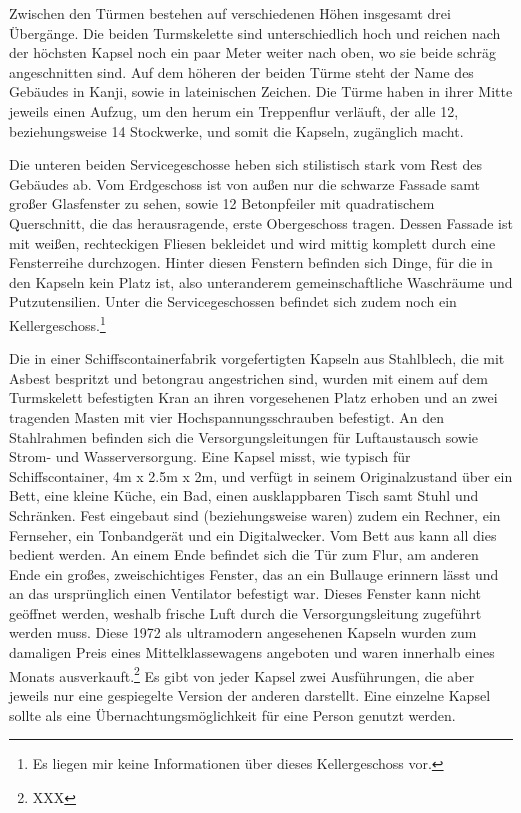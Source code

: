 \documentclass[a4paper, 12pt]{article}
\begin{document}
\begin{onehalfspace}
Zwischen den Türmen bestehen auf verschiedenen Höhen insgesamt drei Übergänge. Die beiden Turmskelette sind unterschiedlich hoch und reichen nach der höchsten Kapsel noch ein paar Meter weiter nach oben, wo sie beide schräg angeschnitten sind. Auf dem höheren der beiden Türme steht der Name des Gebäudes in Kanji, sowie in lateinischen Zeichen. Die Türme haben in ihrer Mitte jeweils einen Aufzug, um den herum ein Treppenflur verläuft, der alle 12, beziehungsweise 14 Stockwerke, und somit die Kapseln, zugänglich macht.

Die unteren beiden Servicegeschosse heben sich stilistisch stark vom Rest des Gebäudes ab. Vom Erdgeschoss ist von außen nur die schwarze Fassade samt großer Glasfenster zu sehen, sowie 12 Betonpfeiler mit quadratischem Querschnitt, die das herausragende, erste Obergeschoss tragen. Dessen Fassade ist mit weißen, rechteckigen Fliesen bekleidet und wird mittig komplett durch eine Fensterreihe durchzogen. Hinter diesen Fenstern befinden sich Dinge, für die in den Kapseln kein Platz ist, also unteranderem gemeinschaftliche Waschräume und Putzutensilien. Unter die Servicegeschossen befindet sich zudem noch ein Kellergeschoss.\footnote{Es liegen mir keine Informationen über dieses Kellergeschoss vor.}

Die in einer Schiffscontainerfabrik vorgefertigten Kapseln aus Stahlblech, die mit Asbest bespritzt und betongrau angestrichen sind, wurden mit einem auf dem Turmskelett befestigten Kran an ihren vorgesehenen Platz erhoben und an zwei tragenden Masten mit vier Hochspannungsschrauben befestigt. An den Stahlrahmen befinden sich die Versorgungsleitungen für Luftaustausch sowie Strom- und Wasserversorgung. Eine Kapsel misst, wie typisch für Schiffscontainer, 4m x 2.5m x 2m, und verfügt in seinem Originalzustand über ein Bett, eine kleine Küche, ein Bad, einen ausklappbaren Tisch samt Stuhl und Schränken. Fest eingebaut sind (beziehungsweise waren) zudem ein Rechner, ein Fernseher, ein Tonbandgerät und ein Digitalwecker. Vom Bett aus kann all dies bedient werden. An einem Ende befindet sich die Tür zum Flur, am anderen Ende ein großes, zweischichtiges Fenster, das an ein Bullauge erinnern lässt und an das ursprünglich einen Ventilator befestigt war. Dieses Fenster kann nicht geöffnet werden, weshalb frische Luft durch die Versorgungsleitung zugeführt werden muss. Diese 1972 als ultramodern angesehenen Kapseln wurden zum damaligen Preis eines Mittelklassewagens angeboten und waren innerhalb eines Monats ausverkauft.\footnote{XXX} Es gibt von jeder Kapsel zwei Ausführungen, die aber jeweils nur eine gespiegelte Version der anderen darstellt. Eine einzelne Kapsel sollte als eine Übernachtungsmöglichkeit für eine Person genutzt werden. 


\end{onehalfspace}
\end{document}
